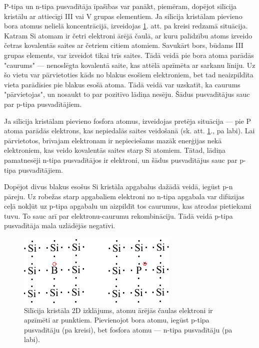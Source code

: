 P-tipa un n-tipa pusvadītāja īpašības var panākt, piemēram, dopējot silīcija kristālu ar attiecīgi III vai V grupas elementiem. Ja silīcija kristālam pievieno bora atomus nelielā koncentrācijā, izveidojas \ref{fig:p-n-type}. att. pa kreisi redzamā situācija. Katram Si atomam ir četri elektroni ārējā čaulā, ar kuru palīdzību atoms izveido četras kovalentās saites ar četriem citiem atomiem. Savukārt bors, būdams III grupas elements, var izveidot tikai trīs saites. Tādā veidā pie bora atoma parādās "caurums" --- nenoslēgta kovalentā saite, kas attēlā apzīmēta ar sarkanu līniju. Uz šo vietu var pārvietoties kāds no blakus esošiem elektroniem, bet tad neaizpildīta vieta parādīsies pie blakus esošā atoma. Tādā veidā var uzskatīt, ka caurums "pārvietojas", un nosaukt to par pozitīvo lādiņa nesēju. Šādus pusvadītājus sauc par p-tipa pusvadītājiem.

Ja silīcija kristālam pievieno fosfora atomus, izveidojas pretēja situācija --- pie P atoma parādās elektrons, kas nepiedalās saites veidošanā (sk. att. \ref{fig:p-n-type}., pa labi). Lai pārvietotos, brīvajam elektronam ir nepieciešams mazāk enerģijas nekā elektroniem, kas veido kovalentās saites starp Si atomiem. Tātad, lādiņa pamatnesēji n-tipa pusvadītājos ir elektroni, un šādus pusvadītājus sauc par p-tipa pusvadītājiem.

Dopējot divus blakus esošus Si kristāla apgabalus dažādā veidā, iegūst p-n pāreju. Uz robežas starp apgabaliem elektroni no n-tipa apgabala var difūzijas ceļā nokļūt uz p-tipa apgabalu un aizpildīt tos caurumus, kas atrodas pietiekami tuvu. To sauc arī par elektronu-caurumu rekombināciju. Tādā veidā p-tipa pusvadītāja mala uzlādējās negatīvi. 

\begin{figure}[h]
	\centering
	\includegraphics[width=0.5\linewidth]{figures/misc/p_n_type.pdf}
	\caption{Silīcija kristāla 2D izklājums, atomu ārējās čaulas elektroni ir apzīmēti ar punktiem. Pievienojot bora atomu, iegūst p-tipa pusvadītāju (pa kreisi), bet fosfora atomu --- n-tipa pusvadītāju (pa labi).}
	\label{fig:p-n-type}
\end{figure}
